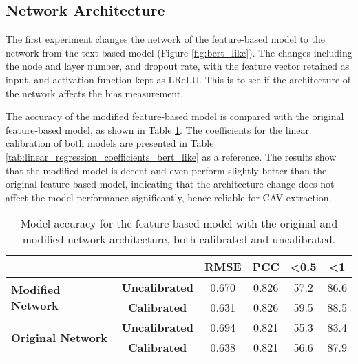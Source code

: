 \subsection{Network Architecture} \label{sec:network_architecture}
The first experiment changes the network of the feature-based model to the network from the text-based model (Figure \ref{fig:bert_like}). The changes including the node and layer number, and dropout rate, with the feature vector retained as input, and activation function kept as LReLU. This is to see if the architecture of the network affects the bias measurement.

The accuracy of the modified feature-based model is compared with the original feature-based model, as shown in Table \ref{tab:model_accuracy_bert_like}. The coefficients for the linear calibration of both models are presented in Table \ref{tab:linear_regression_coefficients_bert_like} as a reference. The results show that the modified model is decent and even perform slightly better than the original feature-based model, indicating that the architecture change does not affect the model performance significantly, hence reliable for CAV extraction.

\begin{table}[H]
    \centering
    \begin{tabular}{|lc|c|c|c|c|}
        \hline
        \multicolumn{2}{|l|}{\textbf{}}                                  & \textbf{RMSE}         & \textbf{PCC} & \textbf{\textless 0.5} & \textbf{\textless 1}        \\ \hline
        \multicolumn{1}{|l|}{\multirow{2}{*}{\textbf{Modified Network}}} & \textbf{Uncalibrated} & 0.670        & 0.826                  & 57.2                 & 86.6 \\ \cline{2-6}
        \multicolumn{1}{|l|}{}                                           & \textbf{Calibrated}   & 0.631        & 0.826                  & 59.5                 & 88.5 \\ \hline
        \multicolumn{1}{|l|}{\multirow{2}{*}{\textbf{Original Network}}} & \textbf{Uncalibrated} & 0.694        & 0.821                  & 55.3                 & 83.4 \\ \cline{2-6}
        \multicolumn{1}{|l|}{}                                           & \textbf{Calibrated}   & 0.638        & 0.821                  & 56.6                 & 87.9 \\ \hline
    \end{tabular}
    \caption{Model accuracy for the feature-based model with the original and modified network architecture, both calibrated and uncalibrated.}
    \label{tab:model_accuracy_bert_like}
\end{table}

